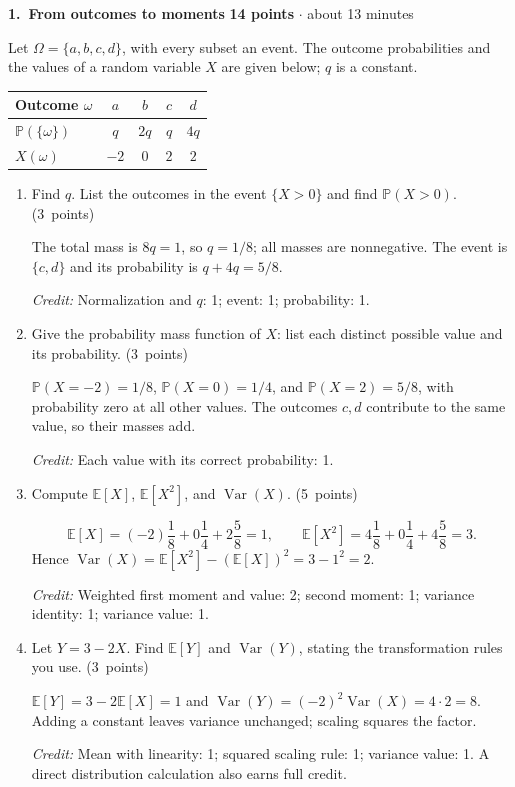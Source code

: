 \documentclass[11pt,letterpaper]{article}
\newcommand{\Prob}{\mathbb P}
\newcommand{\E}{\mathbb E}
\DeclareMathOperator{\Var}{Var}
\newcommand{\partpts}[1]{\unskip\nobreak\hspace{.3em}%
  \mbox{\small\color{muted}(#1 points)}}
\newcommand{\credit}[1]{\par{\footnotesize\color{muted}\textit{Credit:} #1}}
\newcommand{\problem}[4]{\par\addvspace{8pt}%
  {\large\bfseries\color{indigo}#1.\ #2}\hfill
  {\small\color{muted}\textbf{#3 points} $\cdot$ about #4 minutes}\par\nobreak}
\begin{document}
\problem{1}{From outcomes to moments}{14}{13}
Let $\Omega=\{a,b,c,d\}$, with every subset an event. The outcome probabilities
and the values of a random variable $X$ are given below; $q$ is a constant.
\begin{center}
\begin{tabular}{@{}lcccc@{}}
\toprule
Outcome $\omega$ & $a$ & $b$ & $c$ & $d$\\
\midrule
$\Prob(\{\omega\})$ & $q$ & $2q$ & $q$ & $4q$\\[2pt]
$X(\omega)$ & $-2$ & $0$ & $2$ & $2$\\
\bottomrule
\end{tabular}
\end{center}
\begin{enumerate}
  \item Find $q$. List the outcomes in the event $\{X>0\}$ and find
  $\Prob(X>0)$. \partpts{3}
  \begin{solution}[.55in]
    The total mass is $8q=1$, so $q=1/8$; all masses are nonnegative.
    The event is $\{c,d\}$ and its probability is $q+4q=5/8$.
    \credit{Normalization and $q$: 1; event: 1; probability: 1.}
  \end{solution}

  \item Give the probability mass function of $X$: list each distinct
  possible value and its probability. \partpts{3}
  \begin{solution}[.65in]
    $\Prob(X=-2)=1/8$, $\Prob(X=0)=1/4$, and
    $\Prob(X=2)=5/8$, with probability zero at all other values.
    The outcomes $c,d$ contribute to the same value, so their masses add.
    \credit{Each value with its correct probability: 1.}
  \end{solution}

  \item Compute $\E[X]$, $\E[X^2]$, and $\Var(X)$. \partpts{5}
  \begin{solution}[1.05in]
    \[
      \E[X]=(-2)\frac18+0\frac14+2\frac58=1,
      \qquad \E[X^2]=4\frac18+0\frac14+4\frac58=3.
    \]
    Hence $\Var(X)=\E[X^2]-(\E[X])^2=3-1^2=2$.
    \credit{Weighted first moment and value: 2; second moment: 1;
    variance identity: 1; variance value: 1.}
  \end{solution}

  \item Let $Y=3-2X$. Find $\E[Y]$ and $\Var(Y)$, stating the
  transformation rules you use. \partpts{3}
  \begin{solution}[.7in]
    $\E[Y]=3-2\E[X]=1$ and
    $\Var(Y)=(-2)^2\Var(X)=4\cdot2=8$.
    Adding a constant leaves variance unchanged; scaling squares the factor.
    \credit{Mean with linearity: 1; squared scaling rule: 1;
    variance value: 1. A direct distribution calculation also earns full credit.}
  \end{solution}
\end{enumerate}
\end{document}
